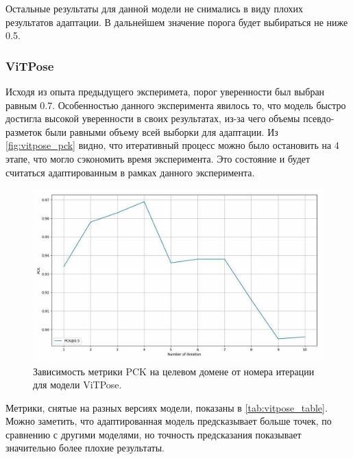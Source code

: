 Остальные результаты для данной модели не снимались в виду плохих результатов адаптации. В дальнейшем значение порога будет выбираться не ниже 0.5.

\subsubsection*{ViTPose}

Исходя из опыта предыдущего эксперимета, порог уверенности был выбран равным 0.7. Особенностью данного эксперимента явилось то, что модель быстро достигла высокой уверенности в своих результатах, из-за чего объемы псевдо-разметок были равными объему всей выборки для адаптации. Из \autoref{fig:vitpose_pck} видно, что итеративный процесс можно было остановить на 4 этапе, что могло сэкономить время эксперимента. Это состояние и будет считаться адаптированным в рамках данного эксперимента.

\begin{figure}[h]
	\centering
	\includegraphics[width=\textwidth]{./images/results/vitpose/vitpose_pck}
	\caption{Зависимость метрики PCK на целевом домене от номера итерации для модели ViTPose.}
	\label{fig:vitpose_pck}
\end{figure}

Метрики, снятые на разных версиях модели, показаны в \autoref{tab:vitpose_table}. Можно заметить, что адаптированная модель предсказывает больше точек, по сравнению с другими моделями, но точность предсказания показывает значительно более плохие результаты. 

